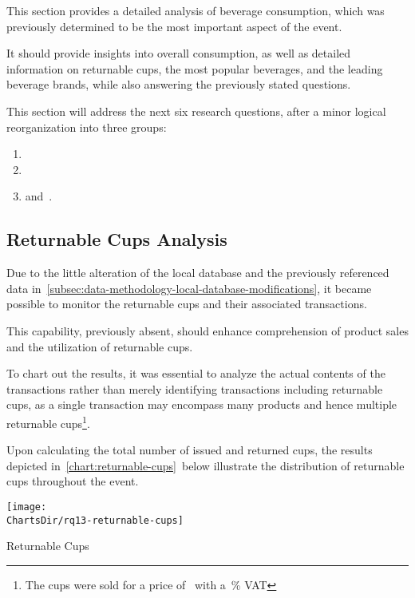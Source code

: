 This section provides a detailed analysis of beverage consumption, which was previously determined to be the most important aspect of the event.

It should provide insights into overall consumption, as well as detailed information on returnable cups, the most popular beverages, and the leading beverage brands, while also answering the previously stated questions.

This section will address the next six research questions, after a minor logical reorganization into three groups:
\begin{enumerate}
	\item {}
	\item {}
	\item and~.
\end{enumerate}


\subsection{Returnable Cups Analysis}
\label{subsec:analysis-beverage-returnable-cups}

Due to the little alteration of the local database and the previously referenced data in~\autoref{subsec:data-methodology-local-database-modifications}, it became possible to monitor the returnable cups and their associated transactions.

This capability, previously absent, should enhance comprehension of product sales and the utilization of returnable cups.


To chart out the results, it was essential to analyze the actual contents of the transactions rather than merely identifying transactions including returnable cups,
as a single transaction may encompass many products and hence multiple returnable cups\footnote{The cups were sold for a price of~ with a~\% VAT}.

Upon calculating the total number of issued and returned cups, the results depicted in~\autoref{chart:returnable-cups}~below illustrate the distribution of returnable cups throughout the event.

\begin{chart}[h]
	\centering
	\texttt{[image: \\ChartsDir/rq13-returnable-cups]}
	\caption{ Returnable Cups}
	\label{chart:returnable-cups}
	\source
\end{chart}

